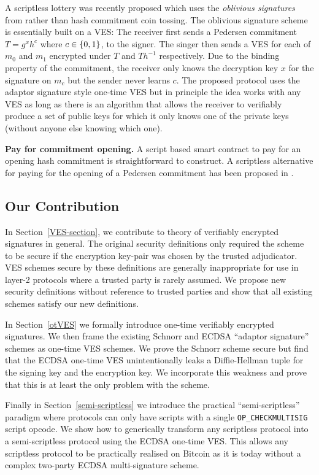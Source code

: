 \documentclass[fullpage]{article}
\theoremstyle{definition}
\begin{document}
A scriptless lottery was recently proposed\cite{fournier_lottery} which uses the \emph{oblivious signatures} from \cite{1-of-n-oblivious-signatures} rather than hash commitment coin tossing. The oblivious signature scheme is essentially built on a VES: The receiver first sends a Pedersen commitment $T = g^xh^c$ where $c \in \{0,1\}$, to the signer. The singer then sends a VES for each of $m_0$ and $m_1$ encrypted under $T$ and $Th^{-1}$ respectively. Due to the binding property of the commitment, the receiver only knows the decryption key $x$ for the signature on $m_c$ but the sender never learns $c$. The proposed protocol uses the adaptor signature style one-time VES but in principle the idea works with any VES as long as there is an algorithm that allows the receiver to verifiably produce a set of public keys for which it only knows one of the private keys (without anyone else knowing which one).

\hfill \break  \textbf{Pay for commitment opening.} A script based smart contract to pay for an opening hash commitment is straightforward to construct. A scriptless alternative for paying for the opening of a Pedersen commitment has been proposed in \cite{pay-for-pedersen}.

\subsection{Our Contribution}

In Section~\ref{VES-section}, we contribute to theory of verifiably encrypted signatures in general. The original security definitions\cite{Boneh:2003:AVE:1766171.1766207} only required the scheme to be secure if the encryption key-pair was chosen by the trusted adjudicator. VES schemes secure by these definitions are generally inappropriate for use in layer-2 protocols where a  trusted party is rarely assumed. We propose new security definitions without reference to trusted parties and show that all existing schemes satisfy our new definitions.

In Section~\ref{otVES} we formally introduce one-time verifiably encrypted signatures. We then frame the existing Schnorr and ECDSA ``adaptor signature'' schemes as one-time VES schemes. We prove the Schnorr scheme secure but find that the ECDSA one-time VES unintentionally leaks a Diffie-Hellman tuple for the signing key and the encryption key. We incorporate this weakness and prove that this is at least the only problem with the scheme.

Finally in Section~\ref{semi-scriptless} we introduce the practical ``semi-scriptless'' paradigm where protocols can only have scripts with a single \texttt{OP\_CHECKMULTISIG} script opcode. We show how to generically transform any scriptless protocol into a semi-scriptless protocol using the ECDSA one-time VES\@. This allows any scriptless protocol to be practically realised on Bitcoin as it is today without a complex two-party ECDSA multi-signature scheme.
\end{document}
